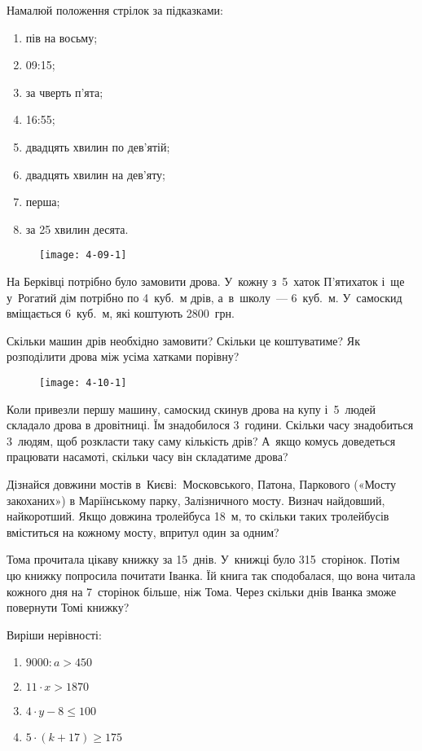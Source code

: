 \problem
Намалюй положення стрілок за підказками:
\begin{enumerate}
    \item пів на восьму;
    \item 09:15;
    \item за чверть п’ята;
    \item 16:55;
    \item двадцять хвилин по дев’ятій;
    \item двадцять хвилин на дев’яту;
    \item перша;
    \item за 25 хвилин десята.
\end{enumerate}

\begin{figure}[ht]
    \centering
    \texttt{[image: 4-09-1]}
\end{figure}


\problem
На Берківці потрібно було замовити дрова.
У~кожну з~5~хаток П'ятихаток і~ще у~Рогатий дім потрібно по 4~куб.~м дрів,
а~в~школу~--- 6~куб.~м.
У~самоскид вміщається 6~куб.~м, які коштують 2800~грн.

Скільки машин дрів необхідно замовити? Скільки це коштуватиме?
Як розподілити дрова між усіма хатками порівну?

\begin{figure}[ht]
    \centering
    \texttt{[image: 4-10-1]}
\end{figure}

Коли привезли першу машину, самоскид скинув дрова на купу і~5~людей
складало дрова в дровітниці. Їм знадобилося 3~години.
Скільки часу знадобиться 3~людям, щоб розкласти таку саму кількість дрів?
А~якщо комусь доведеться працювати насамоті, скільки часу він складатиме дрова?


\problem
Дізнайся довжини мостів в~Києві: Московського, Патона,
Паркового («Мосту закоханих») в Маріїнському парку, Залізничного мосту.
Визнач найдовший, найкоротший.
Якщо довжина тролейбуса 18~м, то скільки таких тролейбусів
вміститься на кожному мосту, впритул один за одним?


\problem
Тома прочитала цікаву книжку за 15~днів. У~книжці було 315~сторінок.
Потім цю книжку попросила почитати Іванка. Їй книга так сподобалася,
що вона читала кожного дня на 7~сторінок більше, ніж Тома.
Через скільки днів Іванка зможе повернути Томі книжку?


\problem
Виріши нерівності:
\begin{multicols}{2}
    \begin{enumerate}
        \item $9000 : a > 450$
        \item $11 \cdot x > 1870$
        \item $4 \cdot y - 8 \leqslant 100$
        \item $5 \cdot (k + 17) \geqslant 175$
    \end{enumerate}
\end{multicols}


